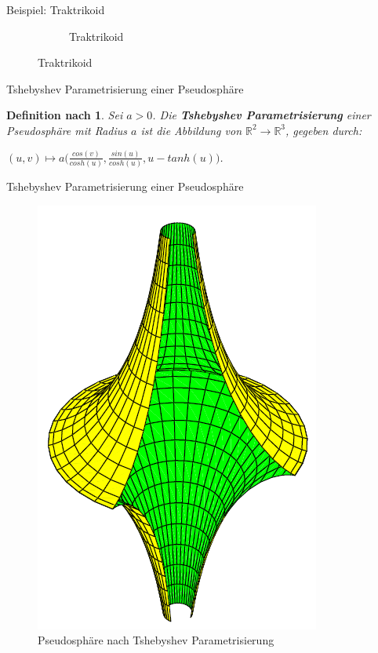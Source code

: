 \documentclass[12pt]{beamer}
\newtheorem{mydef}{Definition nach \cite{gray}}
\begin{document}
\begin{frame}{Beispiel: Traktrikoid}
\begin{figure}
\begin{subfigure}{.5\textwidth}
  \caption{Traktrikoid}
\end{subfigure}

\end{figure}

\end{frame}

\begin{frame}{Tshebyshev Parametrisierung einer Pseudosphäre}
\begin{mydef}
Sei $a > 0$. Die \textbf{Tshebyshev Parametrisierung} einer Pseudosphäre mit Radius $a$ ist die Abbildung von $\mathbb{R}^2 \rightarrow \mathbb{R}^3$, gegeben durch:
\begin{center}
$(u,v) \mapsto a\Big(\frac{cos(v)}{cosh(u)}, \frac{sin(u)}{cosh(u)}, u - tanh(u)\Big)$.
\end{center}
\end{mydef}
\end{frame}

\begin{frame}{Tshebyshev Parametrisierung einer Pseudosphäre}
\begin{figure}[h!]
\includegraphics[scale=0.5]{pseudosphere_tchebyshev.png}
\caption{Pseudosphäre nach Tshebyshev Parametrisierung}
\end{figure}
\end{frame}
\end{document}
